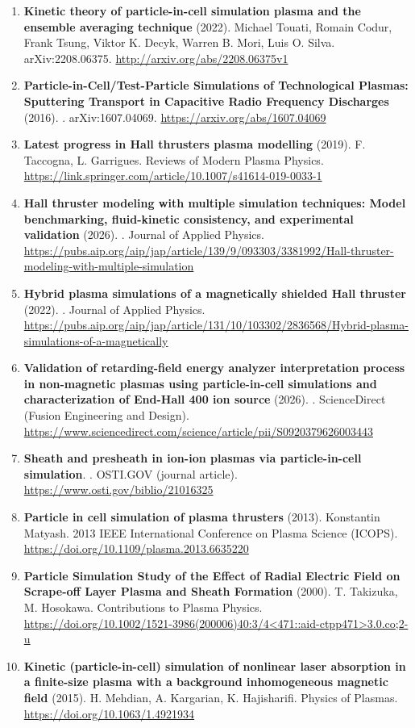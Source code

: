 \documentclass[11pt,a4paper]{article}
\begin{document}
\begin{enumerate}[leftmargin=1.4em]
\item \textbf{Kinetic theory of particle-in-cell simulation plasma and the ensemble averaging technique} (2022). Michael Touati, Romain Codur, Frank Tsung, Viktor K. Decyk, Warren B. Mori, Luis O. Silva. arXiv:2208.06375. \url{http://arxiv.org/abs/2208.06375v1}
\item \textbf{Particle-in-Cell/Test-Particle Simulations of Technological Plasmas: Sputtering Transport in Capacitive Radio Frequency Discharges} (2016). . arXiv:1607.04069. \url{https://arxiv.org/abs/1607.04069}
\item \textbf{Latest progress in Hall thrusters plasma modelling} (2019). F. Taccogna, L. Garrigues. Reviews of Modern Plasma Physics. \url{https://link.springer.com/article/10.1007/s41614-019-0033-1}
\item \textbf{Hall thruster modeling with multiple simulation techniques: Model benchmarking, fluid-kinetic consistency, and experimental validation} (2026). . Journal of Applied Physics. \url{https://pubs.aip.org/aip/jap/article/139/9/093303/3381992/Hall-thruster-modeling-with-multiple-simulation}
\item \textbf{Hybrid plasma simulations of a magnetically shielded Hall thruster} (2022). . Journal of Applied Physics. \url{https://pubs.aip.org/aip/jap/article/131/10/103302/2836568/Hybrid-plasma-simulations-of-a-magnetically}
\item \textbf{Validation of retarding-field energy analyzer interpretation process in non-magnetic plasmas using particle-in-cell simulations and characterization of End-Hall 400 ion source} (2026). . ScienceDirect (Fusion Engineering and Design). \url{https://www.sciencedirect.com/science/article/pii/S0920379626003443}
\item \textbf{Sheath and presheath in ion-ion plasmas via particle-in-cell simulation}. . OSTI.GOV (journal article). \url{https://www.osti.gov/biblio/21016325}
\item \textbf{Particle in cell simulation of plasma thrusters} (2013). Konstantin Matyash. 2013 IEEE International Conference on Plasma Science (ICOPS). \url{https://doi.org/10.1109/plasma.2013.6635220}
\item \textbf{Particle Simulation Study of the Effect of Radial Electric Field on Scrape-off Layer Plasma and Sheath Formation} (2000). T. Takizuka, M. Hosokawa. Contributions to Plasma Physics. \url{https://doi.org/10.1002/1521-3986(200006)40:3/4<471::aid-ctpp471>3.0.co;2-u}
\item \textbf{Kinetic (particle-in-cell) simulation of nonlinear laser absorption in a finite-size plasma with a background inhomogeneous magnetic field} (2015). H. Mehdian, A. Kargarian, K. Hajisharifi. Physics of Plasmas. \url{https://doi.org/10.1063/1.4921934}
\end{enumerate}
\end{document}
